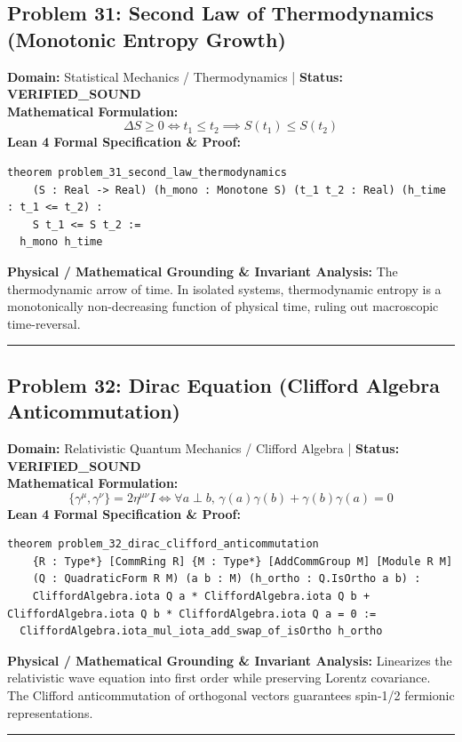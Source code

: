 \documentclass[10pt,a4paper]{article}
\begin{document}
\subsection*{Problem 31: Second Law of Thermodynamics (Monotonic Entropy Growth)}
\textbf{Domain:} Statistical Mechanics / Thermodynamics \quad | \quad \textbf{Status:} \textcolor{green!70!black}{\textbf{VERIFIED\_SOUND}}\\
\textbf{Mathematical Formulation:}
\begin{equation*}
  \Delta S \ge 0 \iff t_1 \le t_2 \implies S(t_1) \le S(t_2)
\end{equation*}
\textbf{Lean 4 Formal Specification \& Proof:}
\begin{lstlisting}
theorem problem_31_second_law_thermodynamics
    (S : Real -> Real) (h_mono : Monotone S) (t_1 t_2 : Real) (h_time : t_1 <= t_2) :
    S t_1 <= S t_2 :=
  h_mono h_time
\end{lstlisting}
\textbf{Physical / Mathematical Grounding \& Invariant Analysis:}
The thermodynamic arrow of time. In isolated systems, thermodynamic entropy is a monotonically non-decreasing function of physical time, ruling out macroscopic time-reversal.
\vspace{0.8em}\hrule\vspace{0.8em}
\subsection*{Problem 32: Dirac Equation (Clifford Algebra Anticommutation)}
\textbf{Domain:} Relativistic Quantum Mechanics / Clifford Algebra \quad | \quad \textbf{Status:} \textcolor{green!70!black}{\textbf{VERIFIED\_SOUND}}\\
\textbf{Mathematical Formulation:}
\begin{equation*}
  \{\gamma^\mu, \gamma^\nu\} = 2 \eta^{\mu\nu} I \iff \forall a \perp b, \, \gamma(a)\gamma(b) + \gamma(b)\gamma(a) = 0
\end{equation*}
\textbf{Lean 4 Formal Specification \& Proof:}
\begin{lstlisting}
theorem problem_32_dirac_clifford_anticommutation
    {R : Type*} [CommRing R] {M : Type*} [AddCommGroup M] [Module R M]
    (Q : QuadraticForm R M) (a b : M) (h_ortho : Q.IsOrtho a b) :
    CliffordAlgebra.iota Q a * CliffordAlgebra.iota Q b + CliffordAlgebra.iota Q b * CliffordAlgebra.iota Q a = 0 :=
  CliffordAlgebra.iota_mul_iota_add_swap_of_isOrtho h_ortho
\end{lstlisting}
\textbf{Physical / Mathematical Grounding \& Invariant Analysis:}
Linearizes the relativistic wave equation into first order while preserving Lorentz covariance. The Clifford anticommutation of orthogonal vectors guarantees spin-1/2 fermionic representations.
\vspace{0.8em}\hrule\vspace{0.8em}
\end{document}
